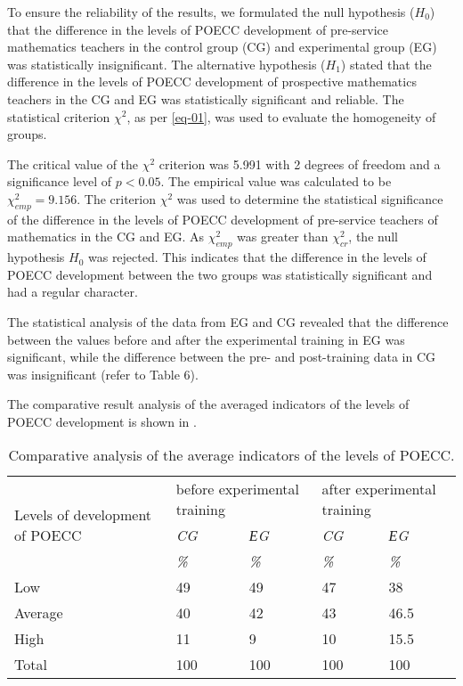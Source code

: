 To ensure the reliability of the results, we formulated the null
hypothesis ($H_0$) that the difference in the
levels of POECC development of pre-service mathematics teachers in the
control group (CG) and experimental group (EG) was statistically
insignificant. The alternative hypothesis
($H_1$) stated that the difference in the
levels of POECC development of prospective mathematics teachers in the
CG and EG was statistically significant and reliable. The statistical
criterion $\chi^2$, as per \cref{eq-01}, was used to evaluate the homogeneity of
groups.



The critical value of the $\chi^{2}$ criterion was 5.991 with 2 degrees of freedom
and a significance level of $p < 0.05$. The empirical
value was calculated to be $\chi^2_{emp} = 9.156$. The criterion $\chi^{2}$ was used to determine
the statistical significance of the difference in the levels of POECC
development of pre-service teachers of mathematics in the CG and EG. As $\chi^2_{emp}$
was greater than $\chi^2_{cr}$, the null hypothesis $H_0$ was
rejected. This indicates that the difference in the levels of POECC
development between the two groups was statistically significant and had
a regular character.



The statistical analysis of the data from EG and CG revealed that the
difference between the values before and after the experimental training
in EG was significant, while the difference between the pre- and
post-training data in CG was insignificant (refer to Table 6).
	
The comparative result analysis of the averaged indicators of the levels of POECC development is shown in .
	
\begin{table}[!htpb]
\centering
\begin{threeparttable}
\caption{Comparative analysis of the average indicators of the levels of POECC.}
\label{tab-05}
\begin{tabular}{l l l l l}
\toprule
\multicolumn{1}{p{3cm}}{\multirow{3}{=}{Levels of development of POECC}} & \multicolumn{2}{p{3cm}}{before experimental training} & \multicolumn{2}{p{3cm}}{after experimental training} \\
& \emph{CG} & \emph{ЕG} & \emph{CG} & \emph{ЕG}  \\
& \emph{\%} & \emph{\%} & \emph{\%} & \emph{\%}  \\
\midrule
Low & 49 & 49 & 47 & 38 \\
Average & 40 & 42 & 43 & 46.5 \\
High & 11 & 9 & 10 & 15.5 \\
Total & 100 & 100 & 100 & 100 \\
\bottomrule
\end{tabular}
\end{threeparttable}
\end{table}
	
